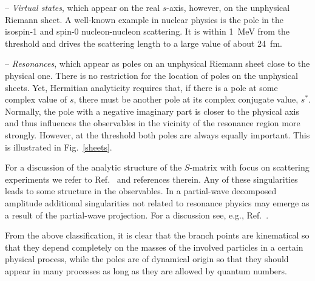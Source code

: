 \begin{itemize}
-- {\it Virtual states}, which appear on the real $s$-axis, however, on the
unphysical Riemann sheet. A well-known example in nuclear physics is
the pole in the isospin-1 and spin-0 nucleon-nucleon scattering. It is within 1~MeV from the
threshold and drives the scattering length to a large value of about 24~fm.

-- {\it Resonances}, which appear as poles on an unphysical Riemann sheet close
to the physical one.  There is no restriction for the location of poles on the
unphysical sheets. Yet, Hermitian analyticity requires that, if there
is a pole at some complex value of $s$, there must be another pole at its
complex conjugate value, $s^*$.
Normally, the pole with a negative imaginary part is closer to the physical axis
and thus influences the observables in the vicinity of the resonance region more
strongly. However, at the threshold both poles are always equally important.
This is illustrated in Fig.~\ref{sheets}.

\end{itemize}


For a discussion of the analytic structure of the $S$-matrix with focus on
scattering experiments we refer to Ref.~\cite{Doring:2009yv} and references
therein.
Any of these singularities leads to some structure in the observables.
In a partial-wave decomposed amplitude additional singularities not related to
resonance physics may emerge as a result of the partial-wave projection. For a
discussion see, e.g., Ref.~\cite{hoehler}.

From the above classification, it is clear that the branch points are
kinematical so that they depend completely on the masses of the involved
particles in a certain physical process, while the poles are of dynamical origin
so that they should appear in many processes as long as they are allowed by
quantum numbers. 

